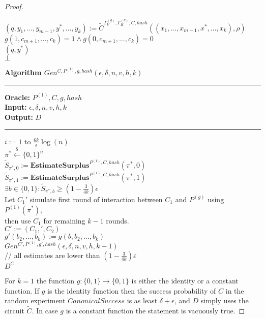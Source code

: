 \begin{proof}
\begin{codeblock}
  \IndI $(q,y_1, \dots, y_{m-1}, y^*, \dots, y_k) := \widetilde{C}^{\Gamma_V^{(g)}, \Gamma_H^{(k)}, C, hash}((x_1, \dots, x_{m-1}, x^*, \dots, x_k), \rho)$\\
  \IndI \If $g(1,c_{m+1}, \dots, c_k) =1 \land g(0,c_{m+1}, \dots, c_k) = 0$ \then \\
  \IndII \return $(q, y^*)$ \\
  \return $\bot$
%
\end{codeblock}
%
\begin{codeblock}
  \textbf{Algorithm $Gen^{C,P^{(1)},g,hash}(\epsilon, \delta, n, v, h, k)$}
  \medskip
  \hrule
  \medskip
  \textbf{Oracle:} $ P^{(1)}, C, g, hash$ \\
  \textbf{Input:}  $\epsilon, \delta, n, v, h, k$\\
  \textbf{Output:} $D$
  \medskip\hrule\medskip
  \For $i:=1$ to $\frac{6k}{\epsilon}\log(n)$ \Do \\
  \IndI $\pi^* \xleftarrow{\$} \{0,1\}^{n}$\\
  \IndI $\widetilde{S}_{\pi^*,0} := \textbf{EstimateSurplus}^{P^{(1)}, C, hash}(\pi^*, 0)$\\
  \IndI $\widetilde{S}_{\pi^*,1} := \textbf{EstimateSurplus}^{P^{(1)}, C, hash}(\pi^*, 1)$\\
  \IndI \If $ \exists b \in \{0,1\}: \widetilde{S}_{\pi^*,b} \geq (1 - \frac{3}{4k}) \epsilon$ \then \\
  \IndII Let $C_1'$ simulate first round of interaction between $C_1$ and $P^{(g)}$ using $P^{(1)}(\pi^*)$, \\
  \IndII then use $C_1$ for remaining $k-1$ rounds. \\
  \IndII $C' := (C_1,', C_2)$ \\
  \IndII $g'(b_2, \dots, b_k) := g(b, b_2, \dots, b_k)$\\
  \IndII\return $Gen^{C', P^{(1)}, g', hash}(\epsilon, \delta, n, v, h, k-1)$ \\
  // all estimates are lower than $(1-\frac{3}{4k})\varepsilon$\\
  \return $D^{C}$
\end{codeblock}
%
%
For $k=1$ the function $g: \{0,1\} \rightarrow \{0,1\}$ is either the identity or a constant function.
If $g$ is the identity function then the success probability of $C$ in the random experiment $CanonicalSuccess$ is as least $\delta + \epsilon$,
and $D$ simply uses the circuit $\widetilde{C}$. In case $g$ is a constant function the statement is vacuously true.


\end{proof}
